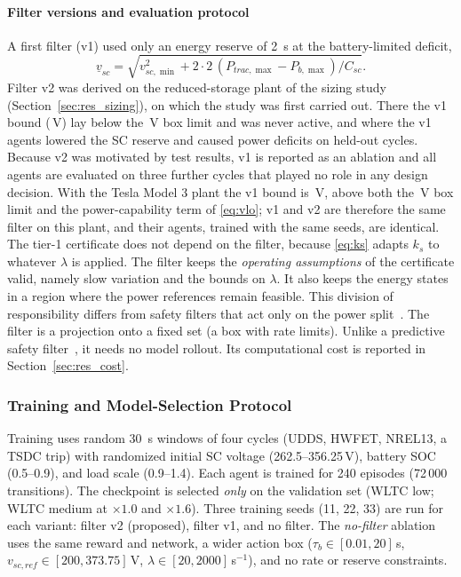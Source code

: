 \paragraph{Filter versions and evaluation protocol}
A first filter (v1) used only an energy reserve of \SI{2}{\second} at the battery-limited deficit,
\[
\underline v_{sc}=\sqrt{v_{sc,\min}^2+2\cdot 2\,(P_{trac,\max}-P_{b,\max})/C_{sc}}.
\] Filter v2 was derived on the reduced-storage plant of the sizing study (Section~\ref{sec:res_sizing}), on which the study was first carried out. There the v1 bound (\GVloVone\,V) lay below the \GBoxLo\,V box limit and was never active, and where the v1 agents lowered the SC reserve and caused power deficits on held-out cycles. Because v2 was motivated by test results, v1 is reported as an ablation and all agents are evaluated on three further cycles that played no role in any design decision. With the Tesla Model 3 plant the v1 bound is \MVloVone\,V, above both the \MBoxLo\,V box limit and the power-capability term of \eqref{eq:vlo}; v1 and v2 are therefore the same filter on this plant, and their agents, trained with the same seeds, are identical.
The tier-1 certificate does not depend on the filter, because \eqref{eq:ks} adapts $k_s$ to whatever $\lambda$ is applied. The filter keeps the \emph{operating assumptions} of the certificate valid, namely slow variation and the bounds on $\lambda$. It also keeps the energy states in a region where the power references remain feasible. This division of responsibility differs from safety filters that act only on the power split~\cite{xu2025safe,wabersich2021psf}. The filter is a projection onto a fixed set (a box with rate limits). Unlike a predictive safety filter~\cite{wabersich2021psf}, it needs no model rollout. Its computational cost is reported in Section~\ref{sec:res_cost}.

\subsubsection{Training and Model-Selection Protocol}
Training uses random \SI{30}{\second} windows of four cycles (UDDS, HWFET, NREL13, a TSDC trip) with randomized initial SC voltage (262.5--356.25\,V), battery SOC (0.5--0.9), and load scale (0.9--1.4). Each agent is trained for 240 episodes (72\,000 transitions). The checkpoint is selected \emph{only} on the validation set (WLTC low; WLTC medium at $\times1.0$ and $\times1.6$). Three training seeds (11, 22, 33) are run for each variant: filter v2 (proposed), filter v1, and no filter. The \emph{no-filter} ablation uses the same reward and network, a wider action box ($\tau_b\in[0.01,20]$\,s, $v_{sc,ref}\in[200,373.75]$\,V, $\lambda\in[20,2000]$\,s$^{-1}$), and no rate or reserve constraints.
